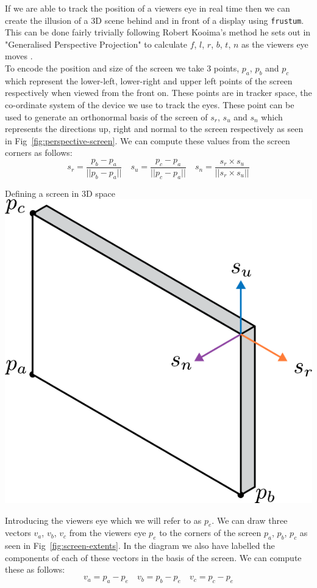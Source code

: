 If we are able to track the position of a viewers eye in real time then we can create the illusion of a 3D scene behind and in front of a display using \texttt{frustum}. This can be done fairly trivially following Robert Kooima's method he sets out in "Generalised Perspective Projection" to calculate $f$, $l$, $r$, $b$, $t$, $n$ as the viewers eye moves \cite{kooima2009generalized}. \\



To encode the position and size of the screen we take 3 points, $p_a$, $p_b$ and $p_c$ which represent the lower-left, lower-right and upper left points of the screen respectively when viewed from the front on. These points are in tracker space, the co-ordinate system of the device we use to track the eyes. These point can be used to generate an orthonormal basis of the screen of $s_r$, $s_u$ and $s_n$ which represents the directions up, right and normal to the screen respectively as seen in Fig~\ref{fig:perspective-screen}. We can compute these values from the screen corners as follows:
\[s_r = \frac{p_b-p_a}{||p_b-p_a||} \quad s_u = \frac{p_c-p_a}{||p_c-p_a||} \quad s_n = \frac{s_r\times s_u}{||s_r \times s_u||}\]

\begin{figureBox}[label={fig:perspective-screen}]{Defining a screen in 3D space}
    \includegraphics[width = 0.3\linewidth]{./background/figures/projection/screen.pdf}
\end{figureBox}

Introducing the viewers eye which we will refer to as $p_e$. We can draw three vectors $v_a$, $v_b$, $v_c$ from the viewers eye $p_e$ to the corners of the screen $p_a$, $p_b$, $p_c$ as seen in Fig~\ref{fig:screen-extents}. In the diagram we also have labelled the components of each of these vectors in the basis of the screen. We can compute these as follows:
\[ v_a = p_a - p_e \quad v_b = p_b - p_e \quad v_c = p_c - p_e\] \\

